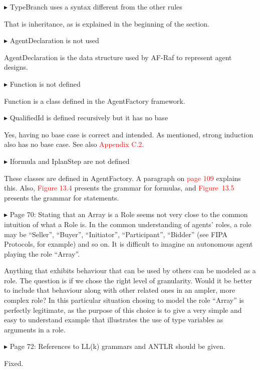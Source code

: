 \documentclass{article}
\newcommand*\R[1]{\textcolor{red}{#1}} %
\newenvironment{them}%
  {\bigskip\noindent\begingroup\color{blue}$\blacktriangleright$\enspace}%
  {\endgroup\par}
\begin{document}
\begin{them}
TypeBranch uses a syntax different from the other rules 
\end{them}
That is inheritance,
  as is explained in the beginning of the section.

\begin{them}
AgentDeclaration is not used 
\end{them}
AgentDeclaration is the data structure used by AF-Raf to represent
  agent designs.

\begin{them}
Function is not defined 
\end{them}
Function is a class defined in the AgentFactory framework.

\begin{them}
QualifiedId is defined recursively but it has no base
\end{them}
Yes, having no base case is correct and intended.
As mentioned, strong induction also has no base case.
See also \R{Appendix C.2}.


\begin{them}
Iformula and IplanStep are not defined
\end{them}
These classes are defined in AgentFactory. A paragraph on \R{page 109}  explains this.
Also, \R{Figure 13.4} presents the grammar for formulas, and \R{Figure~13.5}
presents the grammar for statements.

\begin{them}
Page 70:
Stating that an Array is a Role seems not very close to the common intuition of
what a Role is. In the common understanding of agents' roles, a role may be
``Seller'', ``Buyer'', ``Initiator'', ``Participant'', ``Bidder'' (see FIPA Protocols,
for example) and so on. It is difficult to imagine an autonomous agent playing
the role ``Array''.
\end{them}
Anything that exhibits behaviour that can be used by others can be modeled as a
role. The question is if we chose the right level of granularity. Would it be
better to include that behaviour along with other related ones in an ampler,
more complex role? In this particular situation chosing to model the role
``Array'' is perfectly legitimate, as the purpose of this choice is to give a
very simple and easy to understand example that illustrates the use of type
variables as arguments in a role.

\begin{them}
Page 72:
References to LL(k) grammars and ANTLR should be given.
\end{them}
Fixed.
\end{document}
